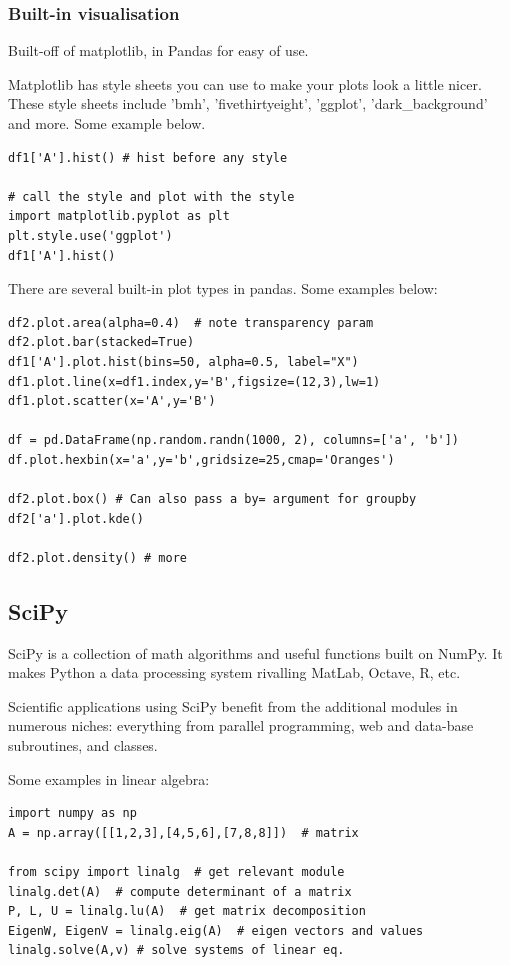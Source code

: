 \documentclass[11pt]{article}
\begin{document}
\subsubsection{Built-in visualisation}
Built-off of matplotlib, in Pandas for easy of use.

Matplotlib has style sheets you can use to make your plots look a little nicer. These style sheets include 'bmh', 'fivethirtyeight', 'ggplot', 'dark\_background' and more. Some example below.

\begin{lstlisting}
df1['A'].hist() # hist before any style

# call the style and plot with the style
import matplotlib.pyplot as plt
plt.style.use('ggplot')
df1['A'].hist()
\end{lstlisting}

There are several built-in plot types in pandas. Some examples below:
\begin{lstlisting}
df2.plot.area(alpha=0.4)  # note transparency param
df2.plot.bar(stacked=True)
df1['A'].plot.hist(bins=50, alpha=0.5, label="X")
df1.plot.line(x=df1.index,y='B',figsize=(12,3),lw=1)
df1.plot.scatter(x='A',y='B')

df = pd.DataFrame(np.random.randn(1000, 2), columns=['a', 'b'])
df.plot.hexbin(x='a',y='b',gridsize=25,cmap='Oranges')

df2.plot.box() # Can also pass a by= argument for groupby
df2['a'].plot.kde()

df2.plot.density() # more
\end{lstlisting}


\subsection{SciPy}
SciPy is a collection of math algorithms and useful functions built on NumPy. It makes Python a data processing system rivalling MatLab, Octave, R, etc.

Scientific applications using SciPy benefit from the additional modules in numerous niches: everything from parallel programming, web and data-base subroutines, and classes.

Some examples in linear algebra:
\begin{lstlisting}
import numpy as np
A = np.array([[1,2,3],[4,5,6],[7,8,8]])  # matrix

from scipy import linalg  # get relevant module
linalg.det(A)  # compute determinant of a matrix
P, L, U = linalg.lu(A)  # get matrix decomposition
EigenW, EigenV = linalg.eig(A)  # eigen vectors and values
linalg.solve(A,v) # solve systems of linear eq.
\end{lstlisting}
\end{document}
